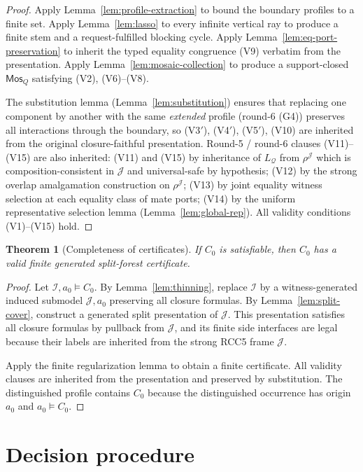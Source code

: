 \documentclass[11pt]{article}
\newtheorem{theorem}{Theorem}[section]
\newcommand{\I}{\mathcal I}
\newcommand{\J}{\mathcal J}
\newcommand{\Q}{\mathcal Q}
\newcommand{\Mos}{\mathsf{Mos}}
\begin{document}
\begin{proof}
Apply Lemma~\ref{lem:profile-extraction} to bound the boundary
profiles to a finite set.  Apply Lemma~\ref{lem:lasso} to every
infinite vertical ray to produce a finite stem and a
request-fulfilled blocking cycle.  Apply
Lemma~\ref{lem:eq-port-preservation} to inherit the typed equality
congruence (V9) verbatim from the presentation.  Apply
Lemma~\ref{lem:mosaic-collection} to produce a support-closed
$\Mos_Q$ satisfying (V2), (V6)--(V8).

The substitution lemma (Lemma~\ref{lem:substitution}) ensures that
replacing one component by another with the same \emph{extended}
profile (round-6 (G4)) preserves all interactions through the
boundary, so (V3$'$), (V4$'$), (V5$'$), (V10) are inherited from the
original closure-faithful presentation.  Round-5 / round-6 clauses
(V11)--(V15) are also inherited: (V11) and (V15) by inheritance of
$L_\Q$ from $\rho^\J$ which is composition-consistent in $\J$ and
universal-safe by hypothesis; (V12) by the strong overlap
amalgamation construction on $\rho^\J$; (V13) by joint equality
witness selection at each equality class of mate ports;\@
(V14) by the uniform representative selection lemma
(Lemma~\ref{lem:global-rep}).  All validity conditions (V1)--(V15)
hold.
\end{proof}

\begin{theorem}[Completeness of certificates]\label{thm:completeness}
If $C_0$ is satisfiable, then $C_0$ has a valid finite generated split-forest certificate.
\end{theorem}

\begin{proof}
Let $\I,a_0\models C_0$.  By Lemma~\ref{lem:thinning}, replace $\I$ by a witness-generated induced submodel $\J,a_0$ preserving all closure formulas.  By Lemma~\ref{lem:split-cover}, construct a generated split presentation of $\J$.  This presentation satisfies all closure formulas by pullback from $\J$, and its finite side interfaces are legal because their labels are inherited from the strong RCC5 frame $\J$.

Apply the finite regularization lemma to obtain a finite certificate.  All validity clauses are inherited from the presentation and preserved by substitution.  The distinguished profile contains $C_0$ because the distinguished occurrence has origin $a_0$ and $a_0\models C_0$.
\end{proof}

\section{Decision procedure}
\end{document}
